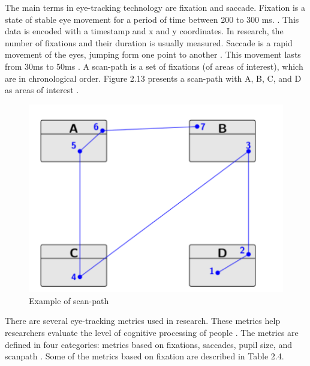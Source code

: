 The main terms in eye-tracking technology are fixation and saccade. 
Fixation is a state of stable eye movement for a period of time between 200 to 300 ms. \cite{sharafi2015systematic}. This data is encoded with a timestamp and x and y coordinates. 
In research, the number of fixations and their duration is usually measured. Saccade is a rapid movement of the eyes, jumping form one point to another \cite{andrzejewska2020development}.
This movement lasts from 30ms to 50ms \cite{obaidellah2018survey}. A scan-path is a set of fixations (of areas of interest), which are in chronological order. Figure 2.13  presents a scan-path with A, B, C, and D as areas of interest  \cite{sharafi2015systematic}.

\begin{figure} [H]
  \centering
  \includegraphics[scale=0.7]{figures/scanp.png}
  \caption{Example of scan-path \cite{sharafi2015systematic}}
  \label{fig:AnhangsChor}
\end{figure}


 
There are several eye-tracking metrics used in research. These metrics help researchers evaluate the level of cognitive processing of people \cite{obaidellah2018survey}. The metrics are defined in four categories: metrics based on fixations,
saccades, pupil size, and scanpath \cite{sharafi2015eye}. Some of the metrics based on fixation are described in Table 2.4.


